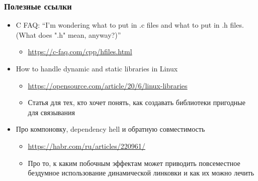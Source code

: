 \documentclass[aspectratio=169]{beamer}
\begin{document}
\begin{frame}
    \frametitle{Полезные ссылки}

    \begin{itemize}
        \item C FAQ: \enquote{I'm wondering what to put in .c files and what to put in .h files. (What does ".h" mean, anyway?)}
              \begin{itemize}
                  \item \url{https://c-faq.com/cpp/hfiles.html}
              \end{itemize}
        \item How to handle dynamic and static libraries in Linux
              \begin{itemize}
                  \item \url{https://opensource.com/article/20/6/linux-libraries}
                  \item Статья для тех, кто хочет понять, как создавать библиотеки пригодные для связывания
              \end{itemize}
        \item Про компоновку, dependency hell и обратную совместимость
              \begin{itemize}
                  \item \url{https://habr.com/ru/articles/220961/}
                  \item Про то, к каким побочным эффектам может приводить повсеместное бездумное использование динамической линковки и как их можно лечить
              \end{itemize}
    \end{itemize}

\end{frame}
\end{document}
